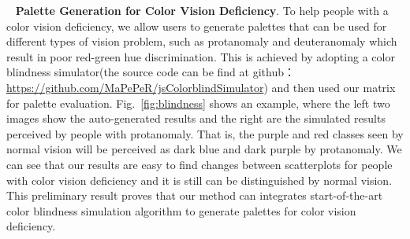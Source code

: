 \documentclass[review,onecolumn]{vgtc}                %
\newcommand{\myparagraph}[1]{\mbox{\ } \newline \noindent \textbf{#1}}
\renewcommand{\paragraph}[1]{\myparagraph{#1}}
\begin{document}
%
%

\paragraph{Palette Generation for Color Vision Deficiency}.
To help people with a color vision deficiency, we allow users to generate palettes that can be used for different types of vision problem, such as protanomaly and deuteranomaly which result in poor red-green hue discrimination. This is achieved by adopting a color blindness simulator(the source code can be find at github： \url{https://github.com/MaPePeR/jsColorblindSimulator}) and then used our matrix for palette evaluation. Fig.~\ref{fig:blindness} shows an example, where the left two images show the auto-generated results and the right are the simulated results perceived by people with protanomaly. That is, the purple and red classes seen by normal vision will be perceived as dark blue and dark purple by protanomaly. We can see that our results are easy to find changes between scatterplots for people with color vision deficiency and it is still can be distinguished by normal vision. This preliminary result proves that our method can integrates start-of-the-art color blindness simulation algorithm to generate palettes for color vision deficiency.
\end{document}
